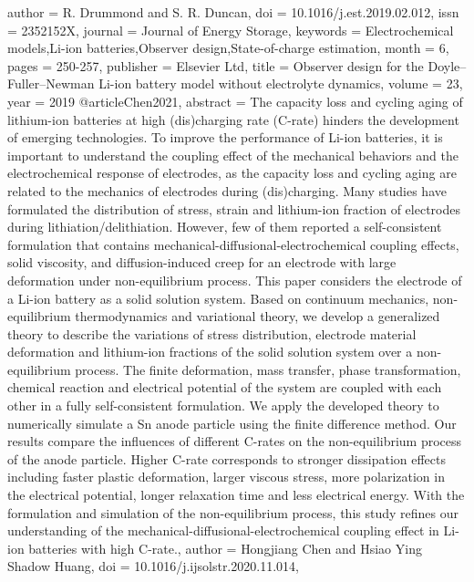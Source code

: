{{{{{   author = {R. Drummond and S. R. Duncan},
   doi = {10.1016/j.est.2019.02.012},
   issn = {2352152X},
   journal = {Journal of Energy Storage},
   keywords = {Electrochemical models,Li-ion batteries,Observer design,State-of-charge estimation},
   month = {6},
   pages = {250-257},
   publisher = {Elsevier Ltd},
   title = {Observer design for the Doyle–Fuller–Newman Li-ion battery model without electrolyte dynamics},
   volume = {23},
   year = {2019}
}
@article{Chen2021,
   abstract = {The capacity loss and cycling aging of lithium-ion batteries at high (dis)charging rate (C-rate) hinders the development of emerging technologies. To improve the performance of Li-ion batteries, it is important to understand the coupling effect of the mechanical behaviors and the electrochemical response of electrodes, as the capacity loss and cycling aging are related to the mechanics of electrodes during (dis)charging. Many studies have formulated the distribution of stress, strain and lithium-ion fraction of electrodes during lithiation/delithiation. However, few of them reported a self-consistent formulation that contains mechanical-diffusional-electrochemical coupling effects, solid viscosity, and diffusion-induced creep for an electrode with large deformation under non-equilibrium process. This paper considers the electrode of a Li-ion battery as a solid solution system. Based on continuum mechanics, non-equilibrium thermodynamics and variational theory, we develop a generalized theory to describe the variations of stress distribution, electrode material deformation and lithium-ion fractions of the solid solution system over a non-equilibrium process. The finite deformation, mass transfer, phase transformation, chemical reaction and electrical potential of the system are coupled with each other in a fully self-consistent formulation. We apply the developed theory to numerically simulate a Sn anode particle using the finite difference method. Our results compare the influences of different C-rates on the non-equilibrium process of the anode particle. Higher C-rate corresponds to stronger dissipation effects including faster plastic deformation, larger viscous stress, more polarization in the electrical potential, longer relaxation time and less electrical energy. With the formulation and simulation of the non-equilibrium process, this study refines our understanding of the mechanical-diffusional-electrochemical coupling effect in Li-ion batteries with high C-rate.},
   author = {Hongjiang Chen and Hsiao Ying Shadow Huang},
   doi = {10.1016/j.ijsolstr.2020.11.014},
}}}}}
